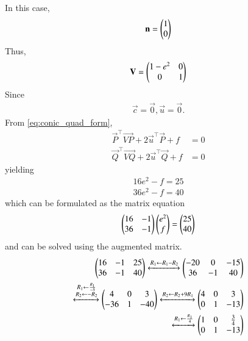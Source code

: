 In this case, 
    \begin{align}
        \mathbf{n} = \begin{pmatrix}1\\0\end{pmatrix}
    \end{align}
    Thus,
    \begin{align}
        \mathbf{V} = \begin{pmatrix}1-e^2&0\\0&1\end{pmatrix} \label{eq:chapters/11/11/3/20/V-val} \\
    \end{align}
Since
\begin{align}
\vec{c} = \vec{0}, \vec{u}=\vec{0}.
\label{eq:chapters/11/11/3/20/8}
    \end{align}
    From \eqref{eq:conic_quad_form},
    \begin{align}
        \vec{P}^\top\vec{VP} + 2\vec{u}^\top\vec{P} + f &= 0 \label{eq:chapters/11/11/3/20/ep1} \\
        \vec{Q}^\top\vec{VQ} + 2\vec{u}^\top\vec{Q} + f &= 0 \label{eq:chapters/11/11/3/20/ep2}
    \end{align}
    yielding
    \begin{align}
        16e^2 - f = 25 \label{eq:chapters/11/11/3/20/e1}
	\\
        36e^2 - f = 40 \label{eq:chapters/11/11/3/20/e2}
    \end{align}
which can be formulated as the matrix equation
    \begin{align}
        \begin{pmatrix}16&-1\\36&-1\end{pmatrix}\begin{pmatrix}e^2\\f\end{pmatrix} = \begin{pmatrix}25\\40\end{pmatrix}
        \label{eq:chapters/11/11/3/20/mtx-eqn}
    \end{align}
    and can be solved using the augmented matrix.
    \begin{align*}
        \begin{pmatrix}16&-1&25\\36&-1&40\end{pmatrix} \xleftrightarrow[]{R_1\leftarrow R_1-R_2} \begin{pmatrix}-20&0&-15\\36&-1&40\end{pmatrix} \\
                 \xleftrightarrow[]{\substack{R_1\leftarrow\frac{R_1}{-5}\\R_2\leftarrow -R_2}} \begin{pmatrix}4&0&3\\-36&1&-40\end{pmatrix} 
                 \xleftrightarrow[]{R_2\leftarrow R_2+9R_1}\begin{pmatrix}4&0&3\\0&1&-13\end{pmatrix} \\
                 \xleftrightarrow[]{R_1\leftarrow\frac{R_1}{4}}\begin{pmatrix}1&0&\frac{3}{4}\\0&1&-13\end{pmatrix}
    \end{align*}
